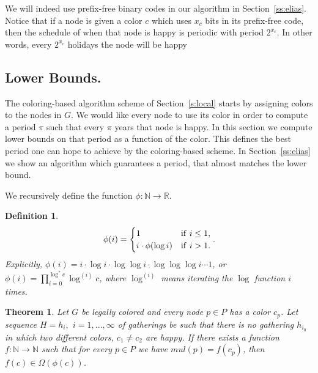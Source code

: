 \documentclass[11pt]{article}
\newtheorem{definition}{Definition}[section]
\newtheorem{theorem}{Theorem}[section]
\begin{document}
We will indeed use prefix-free binary codes in our algorithm in Section~\ref{ss:elias}. Notice that if a node is given a color $c$ which uses $x_c$ bits in its prefix-free code, then the schedule of when that node is happy is periodic with period $2^{x_c}$. In other words, every $2^{x_c}$ holidays the node will be happy


\subsection{Lower Bounds.}\label{ss:lower}

The coloring-based algorithm scheme of Section~\ref{s:local} starts by
assigning colors to the nodes in $G$. We would like every node to use
its color in order to compute a period $\pi$ such that every $\pi$ years that node
is happy. In this section we compute lower bounds on that period as a
function of the color. This defines the best period one can hope to
achieve by the coloring-based scheme. In Section~\ref{ss:elias} we
show an algorithm which guarantees a period, that almost matches the
lower bound.

We recursively define the function $\phi:\mathbb{N}
\rightarrow \mathbb{R}$.

\begin{definition}\label{d:phi}
$$\phi(i)=
\begin{cases}
1 & {\rm if\ } i\le 1,
\cr
i\cdot \phi(\log i) & {\rm if\ } i>1.
\end{cases}
.$$
Explicitly, $\phi(i)= i\cdot \log i\cdot \log \log i\cdot \log \log
\log i\cdots 1$, or $\phi(i)=\prod_{i=0}^{\log^*c} \log^{(i)}c$, where
$\log^{(i)}$ means iterating the $\log$ function $i$ times.
\end{definition}

\begin{theorem}\label{t:lowerbound}
Let $G$ be legally colored  and every node $p\in P$ has a color $c_p$. Let sequence $H=h_i,\,\ i=1,...,\infty$
of gatherings be such that there is no gathering $h_{i_0}$ in
which two different colors, $c_1 \neq c_2$ are happy. If there exists a function $f:\mathbb{N} \rightarrow \mathbb{N}$ such that for every $p\in P$ we have $mul(p)=f(c_p)$, then $f(c)\in \Omega(\phi(c))$.
\end{theorem}
\end{document}
